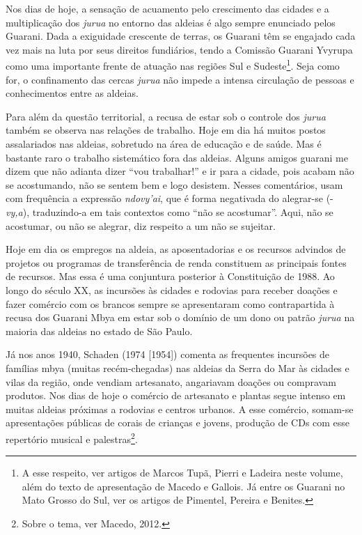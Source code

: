Nos dias de hoje, a sensação de acuamento pelo crescimento das cidades e
a multiplicação dos \emph{jurua} no entorno das aldeias é algo sempre
enunciado pelos Guarani. Dada a exiguidade crescente de terras, os
Guarani têm se engajado cada vez mais na luta por seus direitos
fundiários, tendo a Comissão Guarani Yvyrupa como uma importante frente
de atuação nas regiões Sul e Sudeste\footnote{A esse respeito, ver
  artigos de Marcos Tupã, Pierri e Ladeira neste volume, além do texto
  de apresentação de Macedo e Gallois. Já entre os Guarani no Mato
  Grosso do Sul, ver os artigos de Pimentel, Pereira e Benites.}. Seja
como for, o confinamento das cercas \emph{jurua} não impede a intensa
circulação de pessoas e conhecimentos entre as aldeias.

Para além da questão territorial, a recusa de estar sob o controle dos
\emph{jurua} também se observa nas relações de trabalho. Hoje em dia há
muitos postos assalariados nas aldeias, sobretudo na área de educação e
de saúde. Mas é bastante raro o trabalho sistemático fora das aldeias.
Alguns amigos guarani me dizem que não adianta dizer ``vou trabalhar!''
e ir para a cidade, pois acabam não se acostumando, não se sentem bem e
logo desistem. Nesses comentários, usam com frequência a expressão
\emph{ndovy'ai}, que é forma negativada do alegrar-se (-\emph{vy,a}),
traduzindo-a em tais contextos como ``não se acostumar''. Aqui, não se
acostumar, ou não se alegrar, diz respeito a um não se sujeitar.

Hoje em dia os empregos na aldeia, as aposentadorias e os recursos
advindos de projetos ou programas de transferência de renda constituem
as principais fontes de recursos. Mas essa é uma conjuntura posterior à
Constituição de 1988. Ao longo do século XX, as incursões às cidades e
rodovias para receber doações e fazer comércio com os brancos sempre se
apresentaram como contrapartida à recusa dos Guarani Mbya em estar sob o
domínio de um dono ou patrão \emph{jurua} na maioria das aldeias no
estado de São Paulo.

Já nos anos 1940, Schaden (1974 {[}1954{]}) comenta as frequentes
incursões de famílias mbya (muitas recém-chegadas) nas aldeias da Serra
do Mar às cidades e vilas da região, onde vendiam artesanato, angariavam
doações ou compravam produtos. Nos dias de hoje o comércio de artesanato
e plantas segue intenso em muitas aldeias próximas a rodovias e centros
urbanos. A esse comércio, somam-se apresentações públicas de corais de
crianças e jovens, produção de CDs com esse repertório musical e
palestras\footnote{Sobre o tema, ver Macedo, 2012.}.

